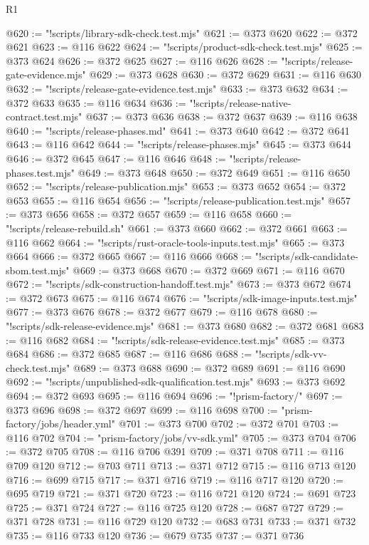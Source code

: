 \begin{lexlean}{R1}
\begin{coremodule}
@620 := "!scripts/library-sdk-check.test.mjs"
@621 := @373 @620
@622 := @372 @621
@623 := @116 @622
@624 := "!scripts/product-sdk-check.test.mjs"
@625 := @373 @624
@626 := @372 @625
@627 := @116 @626
@628 := "!scripts/release-gate-evidence.mjs"
@629 := @373 @628
@630 := @372 @629
@631 := @116 @630
@632 := "!scripts/release-gate-evidence.test.mjs"
@633 := @373 @632
@634 := @372 @633
@635 := @116 @634
@636 := "!scripts/release-native-contract.test.mjs"
@637 := @373 @636
@638 := @372 @637
@639 := @116 @638
@640 := "!scripts/release-phases.md"
@641 := @373 @640
@642 := @372 @641
@643 := @116 @642
@644 := "!scripts/release-phases.mjs"
@645 := @373 @644
@646 := @372 @645
@647 := @116 @646
@648 := "!scripts/release-phases.test.mjs"
@649 := @373 @648
@650 := @372 @649
@651 := @116 @650
@652 := "!scripts/release-publication.mjs"
@653 := @373 @652
@654 := @372 @653
@655 := @116 @654
@656 := "!scripts/release-publication.test.mjs"
@657 := @373 @656
@658 := @372 @657
@659 := @116 @658
@660 := "!scripts/release-rebuild.sh"
@661 := @373 @660
@662 := @372 @661
@663 := @116 @662
@664 := "!scripts/rust-oracle-tools-inputs.test.mjs"
@665 := @373 @664
@666 := @372 @665
@667 := @116 @666
@668 := "!scripts/sdk-candidate-sbom.test.mjs"
@669 := @373 @668
@670 := @372 @669
@671 := @116 @670
@672 := "!scripts/sdk-construction-handoff.test.mjs"
@673 := @373 @672
@674 := @372 @673
@675 := @116 @674
@676 := "!scripts/sdk-image-inputs.test.mjs"
@677 := @373 @676
@678 := @372 @677
@679 := @116 @678
@680 := "!scripts/sdk-release-evidence.mjs"
@681 := @373 @680
@682 := @372 @681
@683 := @116 @682
@684 := "!scripts/sdk-release-evidence.test.mjs"
@685 := @373 @684
@686 := @372 @685
@687 := @116 @686
@688 := "!scripts/sdk-vv-check.test.mjs"
@689 := @373 @688
@690 := @372 @689
@691 := @116 @690
@692 := "!scripts/unpublished-sdk-qualification.test.mjs"
@693 := @373 @692
@694 := @372 @693
@695 := @116 @694
@696 := "!prism-factory/"
@697 := @373 @696
@698 := @372 @697
@699 := @116 @698
@700 := "prism-factory/jobs/header.yml"
@701 := @373 @700
@702 := @372 @701
@703 := @116 @702
@704 := "prism-factory/jobs/vv-sdk.yml"
@705 := @373 @704
@706 := @372 @705
@708 := @116 @706 @391
@709 := @371 @708
@711 := @116 @709 @120
@712 := @703 @711
@713 := @371 @712
@715 := @116 @713 @120
@716 := @699 @715
@717 := @371 @716
@719 := @116 @717 @120
@720 := @695 @719
@721 := @371 @720
@723 := @116 @721 @120
@724 := @691 @723
@725 := @371 @724
@727 := @116 @725 @120
@728 := @687 @727
@729 := @371 @728
@731 := @116 @729 @120
@732 := @683 @731
@733 := @371 @732
@735 := @116 @733 @120
@736 := @679 @735
@737 := @371 @736

\end{coremodule}
\end{lexlean}
